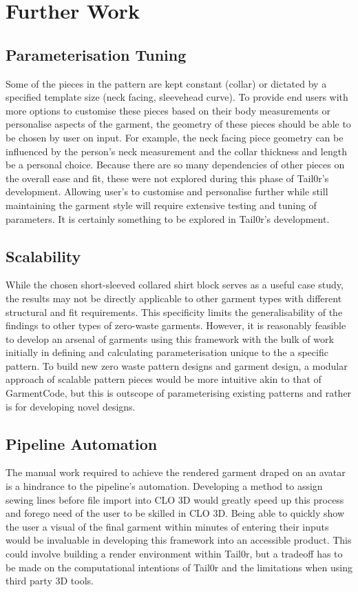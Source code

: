 \section{Further Work} \label{sec:sections}

\subsection{Parameterisation Tuning}
Some of the pieces in the pattern are kept constant (collar) or dictated by a specified template size (neck facing, sleevehead curve). To provide end users with more options to customise these pieces based on their body measurements or personalise aspects of the garment, the geometry of these pieces should be able to be chosen by user on input. For example, the neck facing piece geometry can be influenced by the person's neck measurement and the collar thickness and length be a personal choice. Because there are so many dependencies of other pieces on the overall ease and fit, these were not explored during this phase of Tail0r's development. Allowing user's to customise and personalise further while still maintaining the garment style will require extensive testing and tuning of parameters. It is certainly something to be explored in Tail0r's development.

\subsection{Scalability}
While the chosen short-sleeved collared shirt block serves as a useful case study, the results may not be directly applicable to other garment types with different structural and fit requirements. This specificity limits the generalisability of the findings to other types of zero-waste garments. However, it is reasonably feasible to develop an arsenal of garments using this framework with the bulk of work initially in defining and calculating parameterisation unique to the a specific pattern. To build new zero waste pattern designs and garment design, a modular approach of scalable pattern pieces would be more intuitive akin to that of GarmentCode, but this is outscope of parameterising existing patterns and rather is for developing novel designs.

\subsection{Pipeline Automation}
The manual work required to achieve the rendered garment draped on an avatar is a hindrance to the pipeline's automation. Developing a method to assign sewing lines before file import into CLO 3D would greatly speed up this process and forego need of the user to be skilled in CLO 3D. Being able to quickly show the user a visual of the final garment within minutes of entering their inputs would be invaluable in developing this framework into an accessible product. This could involve building a render environment within Tail0r, but a tradeoff has to be made on the computational intentions of Tail0r and the limitations when using third party 3D tools.

